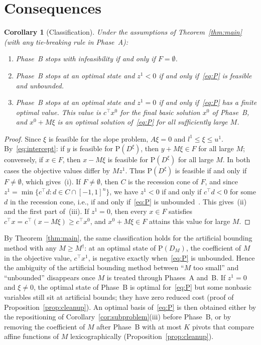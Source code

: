 \documentclass[11pt,a4paper]{article}
\theoremstyle{plain}
\newtheorem{corollary}[theorem]{Corollary}
\theoremstyle{definition}
\theoremstyle{remark}
\newcommand{\Pb}{\mathrm{P}}
\begin{document}
\section{Consequences}
\label{sec:consequences}

\begin{corollary}[Classification]
\label{cor:classification}
Under the assumptions of Theorem~\ref{thm:main} (with any tie-breaking rule in Phase~A):
\begin{enumerate}[label=(\roman*)]
\item Phase~B stops with infeasibility if and only if $F=\emptyset$.
\item Phase~B stops at an optimal state and $z^1<0$ if and only if~\eqref{eq:P} is feasible and unbounded.
\item Phase~B stops at an optimal state and $z^1=0$ if and only if~\eqref{eq:P} has a finite optimal value. This value is $c^\top x^0$ for the final basic solution $x^0$ of Phase~B, and $x^0+M\xi$ is an optimal solution of~\eqref{eq:P} for all sufficiently large $M$.
\end{enumerate}
\end{corollary}
\begin{proof}
Since $\xi$ is feasible for the slope problem, $A\xi=0$ and $l^1\le\xi\le u^1$. By~\eqref{eq:intercept}: if $y$ is feasible for $\Pb(D^\xi)$, then $y+M\xi\in F$ for all large $M$; conversely, if $x\in F$, then $x-M\xi$ is feasible for $\Pb(D^\xi)$ for all large $M$. In both cases the objective values differ by $Mz^1$. Thus $\Pb(D^\xi)$ is feasible if and only if $F\neq\emptyset$, which gives~(i). If $F\neq\emptyset$, then $C$ is the recession cone of $F$, and since $z^1=\min\{c^\top d: d\in C\cap[-1,1]^n\}$, we have $z^1<0$ if and only if $c^\top d<0$ for some $d$ in the recession cone, i.e., if and only if~\eqref{eq:P} is unbounded~\cite{bertsimas1997}. This gives~(ii) and the first part of~(iii). If $z^1=0$, then every $x\in F$ satisfies $c^\top x=c^\top(x-M\xi)\ge c^\top x^0$, and $x^0+M\xi\in F$ attains this value for large $M$.
\end{proof}

By Theorem~\ref{thm:main}, the same classification holds for the artificial bounding method with any $M\ge M^\dagger$: at an optimal state of $\Pb(D_M)$, the coefficient of $M$ in the objective value, $c^\top x^1$, is negative exactly when~\eqref{eq:P} is unbounded. Hence the ambiguity of the artificial bounding method between ``$M$ too small'' and ``unbounded'' disappears once $M$ is treated through Phases~A and~B. If $z^1=0$ and $\xi\neq0$, the optimal state of Phase~B is optimal for~\eqref{eq:P} but some nonbasic variables still sit at artificial bounds; they have zero reduced cost (proof of Proposition~\ref{prop:cleanup}). An optimal basis of~\eqref{eq:P} is then obtained either by the repositioning of Corollary~\ref{cor:subproblem}(iii) before Phase~B, or by removing the coefficient of $M$ after Phase~B with at most $K$ pivots that compare affine functions of $M$ lexicographically (Proposition~\ref{prop:cleanup}).
\end{document}
